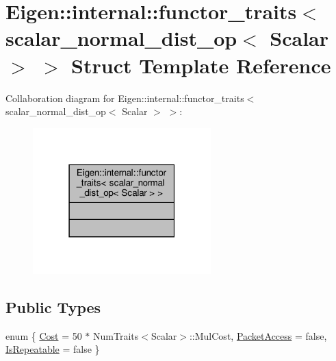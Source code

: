 \hypertarget{structEigen_1_1internal_1_1functor__traits_3_01scalar__normal__dist__op_3_01Scalar_01_4_01_4}{}\section{Eigen\+:\+:internal\+:\+:functor\+\_\+traits$<$ scalar\+\_\+normal\+\_\+dist\+\_\+op$<$ Scalar $>$ $>$ Struct Template Reference}
\label{structEigen_1_1internal_1_1functor__traits_3_01scalar__normal__dist__op_3_01Scalar_01_4_01_4}


Collaboration diagram for Eigen\+:\+:internal\+:\+:functor\+\_\+traits$<$ scalar\+\_\+normal\+\_\+dist\+\_\+op$<$ Scalar $>$ $>$\+:\nopagebreak
\begin{figure}[H]
\begin{center}
\leavevmode
\includegraphics[width=195pt]{d6/da9/structEigen_1_1internal_1_1functor__traits_3_01scalar__normal__dist__op_3_01Scalar_01_4_01_4__coll__graph}
\end{center}
\end{figure}
\subsection*{Public Types}
\begin{DoxyCompactItemize}
\item 
enum \{ \hyperlink{structEigen_1_1internal_1_1functor__traits_3_01scalar__normal__dist__op_3_01Scalar_01_4_01_4_aa24d49756a42945135cf4bb233f70852ad22cd8b04dd82075ca39efd3ba99acd6}{Cost} = 50 $\ast$ Num\+Traits$<$Scalar$>$\+:\+:Mul\+Cost, 
\hyperlink{structEigen_1_1internal_1_1functor__traits_3_01scalar__normal__dist__op_3_01Scalar_01_4_01_4_aa24d49756a42945135cf4bb233f70852aa50396f958a83c30593e034700290b00}{Packet\+Access} = false, 
\hyperlink{structEigen_1_1internal_1_1functor__traits_3_01scalar__normal__dist__op_3_01Scalar_01_4_01_4_aa24d49756a42945135cf4bb233f70852a953ef8c87ba7a342649b4b09347c6fda}{Is\+Repeatable} = false
 \}
\end{DoxyCompactItemize}



